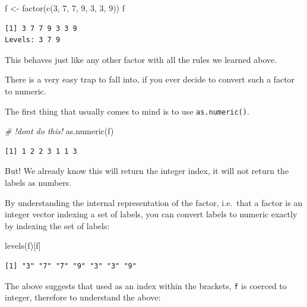 \documentclass[
]{book}
\newenvironment{Shaded}{\begin{snugshade}}{\end{snugshade}}
\newcommand{\CommentTok}[1]{\textcolor[rgb]{0.56,0.35,0.01}{\textit{#1}}}
\newcommand{\DecValTok}[1]{\textcolor[rgb]{0.00,0.00,0.81}{#1}}
\newcommand{\FunctionTok}[1]{\textcolor[rgb]{0.00,0.00,0.00}{#1}}
\newcommand{\NormalTok}[1]{#1}
\newcommand{\OtherTok}[1]{\textcolor[rgb]{0.56,0.35,0.01}{#1}}
\begin{document}
\begin{Shaded}
\begin{Highlighting}[]
\NormalTok{f }\OtherTok{\textless{}{-}} \FunctionTok{factor}\NormalTok{(}\FunctionTok{c}\NormalTok{(}\DecValTok{3}\NormalTok{, }\DecValTok{7}\NormalTok{, }\DecValTok{7}\NormalTok{, }\DecValTok{9}\NormalTok{, }\DecValTok{3}\NormalTok{, }\DecValTok{3}\NormalTok{, }\DecValTok{9}\NormalTok{))}
\NormalTok{f}
\end{Highlighting}
\end{Shaded}

\begin{verbatim}
[1] 3 7 7 9 3 3 9
Levels: 3 7 9
\end{verbatim}

This behaves just like any other factor with all the rules we learned above.

There is a very easy trap to fall into, if you ever decide to convert such a factor to numeric.

The first thing that usually comes to mind is to use \texttt{as.numeric()}.

\begin{Shaded}
\begin{Highlighting}[]
\CommentTok{\# !don\textquotesingle{}t do this!}
\FunctionTok{as.numeric}\NormalTok{(f)}
\end{Highlighting}
\end{Shaded}

\begin{verbatim}
[1] 1 2 2 3 1 1 3
\end{verbatim}

But! We already know this will return the integer index, it will not return the labels as numbers.

By understanding the internal representation of the factor, i.e.~that a factor is an integer vector indexing a set of labels, you can convert labels to numeric exactly by indexing the set of labels:

\begin{Shaded}
\begin{Highlighting}[]
\FunctionTok{levels}\NormalTok{(f)[f]}
\end{Highlighting}
\end{Shaded}

\begin{verbatim}
[1] "3" "7" "7" "9" "3" "3" "9"
\end{verbatim}

The above suggests that used as an index within the brackets, \texttt{f} is coerced to integer, therefore to understand the above:
\end{document}

